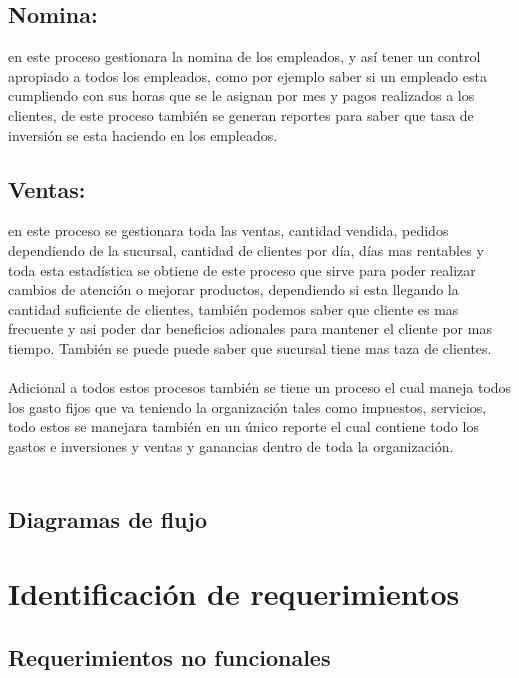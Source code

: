 \subsection{Nomina:}en este proceso gestionara la nomina de los empleados, y as\'i tener un control apropiado a todos los empleados, como por ejemplo saber si un empleado esta cumpliendo con sus horas que se le asignan por mes y pagos realizados a los clientes, de este proceso tambi\'en se generan reportes para saber que tasa de inversi\'on se esta haciendo en los empleados.
\subsection{Ventas:}en este proceso se gestionara toda las ventas, cantidad vendida, pedidos dependiendo de la sucursal, cantidad de clientes por d\'ia, d\'ias mas rentables y toda esta estad\'istica se obtiene de este proceso que sirve para poder realizar cambios de atenci\'on o mejorar productos, dependiendo si esta llegando la cantidad suficiente de clientes, tambi\'en podemos saber que cliente es mas frecuente y asi poder dar beneficios adionales para mantener el cliente por mas tiempo. Tambi\'en se puede puede saber que sucursal tiene mas taza de clientes.
\\%
\\%
Adicional a todos estos procesos tambi\'en se tiene un proceso el cual maneja todos los gasto fijos que va teniendo la organizaci\'on tales como impuestos, servicios, todo estos se manejara tambi\'en en un \'unico reporte el cual contiene todo los gastos e inversiones y  ventas y ganancias dentro de toda la organizaci\'on.
\\%
\\%

%
\newpage%
\subsection{Diagramas de flujo}
%
\newpage%
\section{Identificaci\'on de requerimientos}
\subsection{Requerimientos no funcionales}
%
\newpage%
